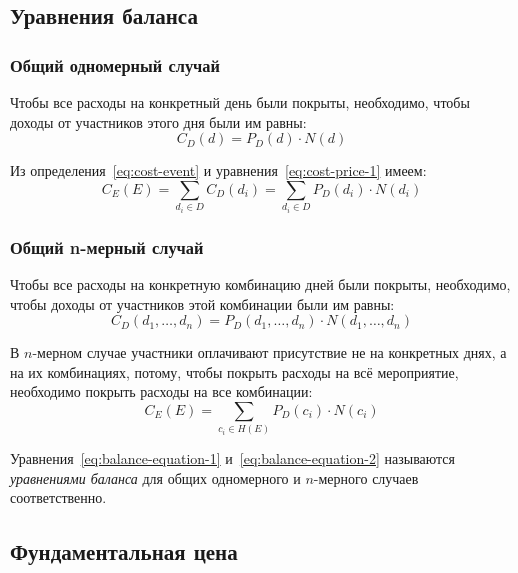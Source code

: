 \subsection{Уравнения баланса}

\subsubsection{Общий одномерный случай}

Чтобы все расходы на конкретный день были покрыты, необходимо, чтобы доходы от участников этого дня были им равны:
\begin{equation}
	C_D(d) = P_D(d) \cdot N(d)
	\label{eq:cost-price-1}
\end{equation}

Из определения~\ref{eq:cost-event} и уравнения~\ref{eq:cost-price-1} имеем:
\begin{equation}
	C_E(E) = \sum_{d_i \in D} C_D(d_i) = \sum_{d_i \in D}{P_D(d_i) \cdot N(d_i)}
	\label{eq:balance-equation-1}
\end{equation}

\subsubsection{Общий n-мерный случай}

Чтобы все расходы на конкретную комбинацию дней были покрыты, необходимо, чтобы доходы от участников этой комбинации были им равны:
\begin{equation}
	C_D(d_1, \dots, d_n) = P_D(d_1, \dots, d_n) \cdot N(d_1, \dots, d_n)
	\label{eq:cost-price-2}
\end{equation}

В $n$-мерном случае участники оплачивают присутствие не на конкретных днях, а на их комбинациях, потому, чтобы покрыть расходы на всё мероприятие, необходимо покрыть расходы на все комбинации:
\begin{equation}
	C_E(E) = \sum_{c_i \in H(E)}{P_D(c_i) \cdot N(c_i)}
	\label{eq:balance-equation-2}
\end{equation}

Уравнения~\ref{eq:balance-equation-1} и~\ref{eq:balance-equation-2} называются \textit{уравнениями баланса} для общих одномерного и $n$-мерного случаев соответственно.

\subsection{Фундаментальная цена}

